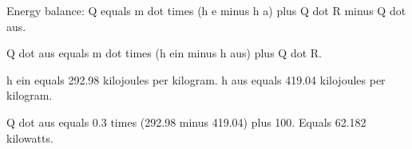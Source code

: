Energy balance:  
Q equals m dot times (h e minus h a) plus Q dot R minus Q dot aus.  

Q dot aus equals m dot times (h ein minus h aus) plus Q dot R.  

h ein equals 292.98 kilojoules per kilogram.  
h aus equals 419.04 kilojoules per kilogram.  

Q dot aus equals 0.3 times (292.98 minus 419.04) plus 100.  
Equals 62.182 kilowatts.